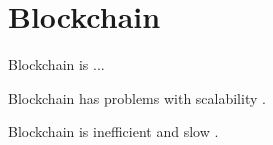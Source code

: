 \section{Blockchain}

Blockchain is ... \cite{blockchain_review}

Blockchain has problems with scalability \cite{blockchain_scale}.

Blockchain is inefficient and slow \cite{blockchain_scale}.